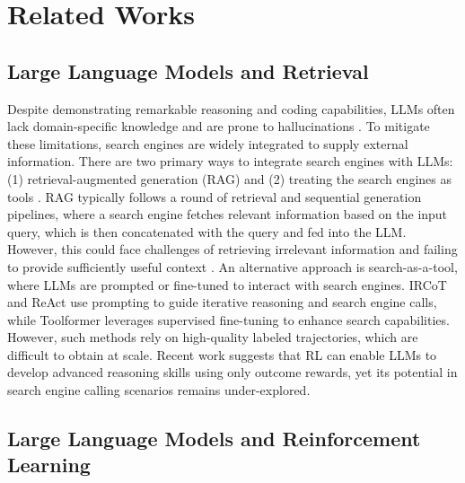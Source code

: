 
\section{Related Works}

\subsection{Large Language Models and Retrieval}

Despite demonstrating remarkable reasoning \citep{guo2025deepseek} and coding \citep{guo2024deepseek} capabilities, LLMs \citep{zhao2023survey, team2024gemini, achiam2023gpt} often lack domain-specific knowledge \citep{peng2023study,li2023large} and are prone to hallucinations \citep{zhang2023siren}. To mitigate these limitations, search engines \citep{zhao2024dense} are widely integrated to supply external information.
There are two primary ways to integrate search engines with LLMs: (1) retrieval-augmented generation (RAG) \citep{gao2023retrieval} and (2) treating the search engines as tools \citep{schick2023toolformer}. RAG \citep{lewis2020retrieval, yue2024inference, xiong2025rag} typically follows a round of retrieval and sequential generation pipelines, where a search engine fetches relevant information based on the input query, which is then concatenated with the query and fed into the LLM. However, this could face challenges of retrieving irrelevant information \citep{jin2024long} and failing to provide sufficiently useful context \citep{jiang2023active}.
An alternative approach is search-as-a-tool, where LLMs are prompted or fine-tuned to interact with search engines. IRCoT \citep{trivedi2022interleaving} and ReAct \citep{yao2023react} use prompting to guide iterative reasoning and search engine calls, while Toolformer \citep{schick2023toolformer} leverages supervised fine-tuning to enhance search capabilities. However, such methods rely on high-quality labeled trajectories, which are difficult to obtain at scale. Recent work \citep{guo2025deepseek} suggests that RL can enable LLMs to develop advanced reasoning skills using only outcome rewards, yet its potential in search engine calling scenarios remains under-explored.

\subsection{Large Language Models and Reinforcement Learning}


